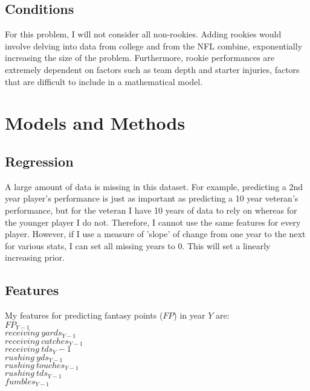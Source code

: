 \documentclass{article} %
\begin{document}
\subsection{Conditions}

For this problem, I will not consider all non-rookies. Adding rookies would involve delving into data from college and from the NFL combine, exponentially increasing the size of the problem. Furthermore, rookie performances are extremely dependent on factors such as team depth and starter injuries, factors that are difficult to include in a mathematical model.


\section{Models and Methods}

\subsection{Regression}

A large amount of data is missing in this dataset. For example, predicting a 2nd year player's performance is just as important as predicting a 10 year veteran's performance, but for the veteran I have 10 years of data to rely on whereas for the younger player I do not. Therefore, I cannot use the same features for every player. However, if I use a measure of 'slope' of change from one year to the next for various stats, I can set all missing years to 0. This will set a linearly increasing prior.

\subsection{Features}

My features for predicting fantasy points ($FP$) in year $Y$ are: \\

$FP_{Y-1}$ \\
$receiving \ yards_{Y-1}$ \\
$receiving \ catches_{Y-1}$ \\
$receiving \ tds{_Y-1}$ \\
$rushing \ yds_{Y-1}$ \\
$rushing \ touches_{Y-1}$ \\
$rushing \ tds_{Y-1}$ \\
$fumbles_{Y-1}$ \\
\end{document}
